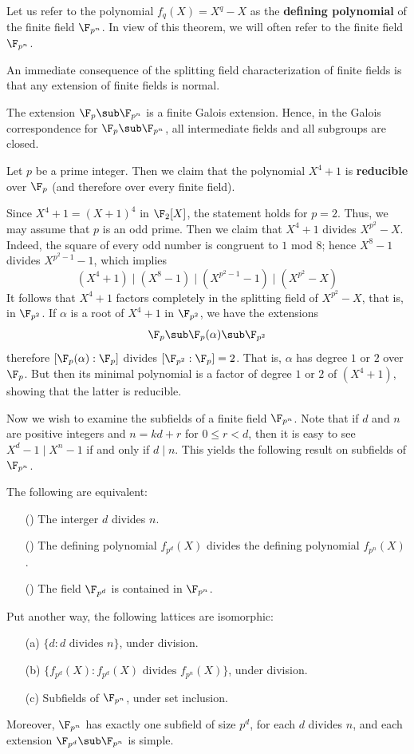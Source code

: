 Let us refer to the polynomial $f_q(X)=X^q-X$ as the \textbf{defining polynomial} of the finite field $\F_{p^n}$. In view of this theorem, we will often refer to the finite field $\F_{p^n}$.\par
An immediate consequence of the splitting field characterization of finite fields is that any extension of finite fields is normal.
\begin{corollary}
The extension $\F_{p}\sub\F_{p^n}$ is a finite Galois extension. Hence, in the Galois correspondence for $\F_p\sub\F_{p^n}$, all intermediate fields and all subgroups are closed.
\end{corollary}
\begin{example}
Let $p$ be a prime integer. Then we claim that the polynomial $X^4+1$ is \textbf{reducible} over $\F_p$ (and therefore over every finite field).\par
Since $X^4+1=(X+1)^4$ in $\F_2[X]$, the statement holds for $p=2$. Thus, we may assume that $p$ is an odd prime. Then we claim that $X^4+1$ divides $X^{p^2}-X$. Indeed, the square of every odd number is congruent to $1$ mod $8$; hence $X^8-1$ divides $X^{p^2-1}-1$, which implies
\[(X^4+1)\mid(X^8-1)\mid(X^{p^2-1}-1)\mid(X^{p^2}-X)\]
It follows that $X^4+1$ factors completely in the splitting field of $X^{p^2}-X$, that is, in $\F_{p^2}$. If $\alpha$ is a root of $X^4+1$ in $\F_{p^2}$, we have the extensions
\[\F_p\sub \F_p(\alpha)\sub\F_{p^2}\]
therefore $[\F_p(\alpha):\F_p]$ divides $[\F_{p^2}:\F_p]=2$. That is, $\alpha$ has degree $1$ or $2$ over $\F_p$. But then its minimal polynomial is a factor of degree $1$ or $2$ of $(X^4+1)$,
showing that the latter is reducible.
\end{example}
Now we wish to examine the subfields of a finite field $\F_{p^n}$. Note that if $d$ and $n$ are positive integers and $n=kd+r$ for $0\leq r<d$, then it is easy to see $X^d-1\mid X^n-1$ if and only if $d\mid n$. This yields the following result on subfields of $\F_{p^n}$.
\begin{proposition}\label{finite field subfield iff order divide}
The following are equivalent:
\begin{itemize}
\item[(\rmnum{1})] The interger $d$ divides $n$.
\item[(\rmnum{2})] The defining polynomial $f_{p^d}(X)$ divides the defining polynomial $f_{p^n}(X)$.
\item[(\rmnum{3})] The field $\F_{p^d}$ is contained in $\F_{p^n}$. 
\end{itemize}
Put another way, the following lattices are isomorphic:
\begin{itemize}
\item[(a)] $\{d:\text{$d$ divides $n$}\}$, under division.
\item[(b)] $\{f_{p^d}(X):\text{$f_{p^d}(X)$ divides $f_{p^n}(X)$}\}$, under division.
\item[(c)] Subfields of $\F_{p^n}$, under set inclusion.
\end{itemize}
Moreover, $\F_{p^n}$ has exactly one subfield of size $p^d$, for each $d$ divides $n$, and each extension $\F_{p^d}\sub\F_{p^n}$ is simple.
\end{proposition}
